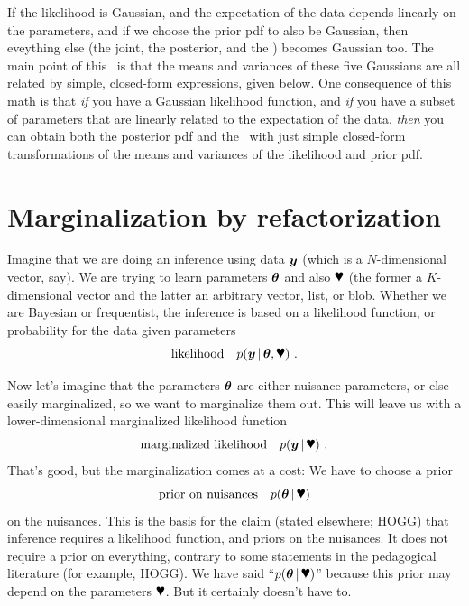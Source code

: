 If the likelihood is Gaussian, and the expectation of the data depends linearly
on the parameters, and if we choose the prior pdf to also be Gaussian, then
eveything else (the joint, the posterior, and the \FML) becomes Gaussian too.
The main point of this \documentname\ is that the means and variances of these
five Gaussians are all related by simple, closed-form expressions, given below.
One consequence of this math is that \emph{if} you have a Gaussian
likelihood function, and \emph{if} you have a subset of parameters
that are linearly related to the expectation of the data, \emph{then}
you can obtain both the posterior pdf and the \FML\ with just simple
closed-form transformations of the means and variances of the
likelihood and prior pdf.

\section{Marginalization by refactorization}

Imagine that we are doing an inference using data $\boldsymbol{y}$ (which is a
$N$-dimensional vector, say).
We are trying to learn parameters $\boldsymbol{\theta}$ and also $\bP$ (the former a
$K$-dimensional vector and the latter an arbitrary vector, list,
or blob.
Whether we are Bayesian or frequentist, the inference is based on
a likelihood function, or probability for the data given parameters
\begin{equation}
\mbox{likelihood} \quad p(\vy\given\vtheta,\bP)
~ .
\end{equation}

Now let's imagine that the parameters $\boldsymbol{\theta}$ are either nuisance
parameters, or else easily marginalized, so we want to marginalize
them out.
This will leave us with a lower-dimensional marginalized likelihood
function
\begin{equation}
\mbox{marginalized likelihood} \quad p(\vy\given\bP)
~ .
\end{equation}
That's good, but the marginalization comes at a cost:
We have to choose a prior
\begin{equation}
\mbox{prior on nuisances} \quad p(\vtheta\given\bP)
\end{equation}
on the nuisances.
This is the basis for the claim (stated elsewhere; HOGG) that
inference requires a likelihood function, and priors on the nuisances.
It does not require a prior on everything, contrary to some statements
in the pedagogical literature (for example, HOGG).
We have said ``$p(\vtheta\given\bP)$'' because this prior may depend on
the parameters $\bP$. But it certainly doesn't have to.

